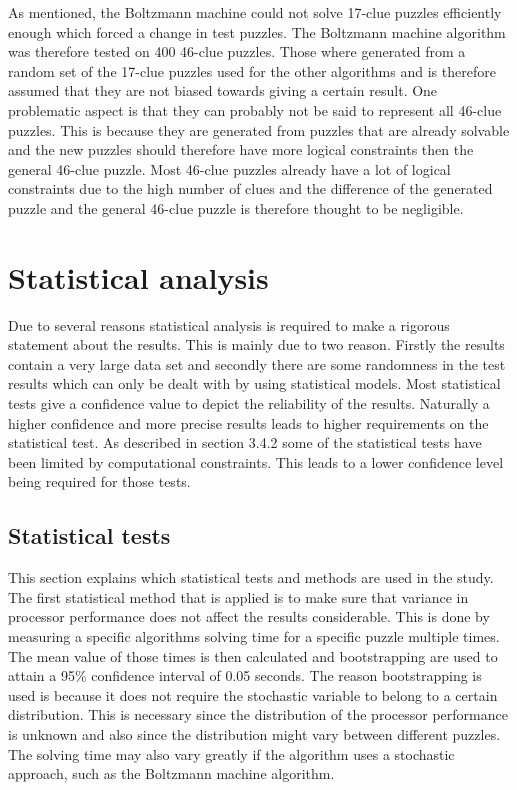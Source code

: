 \documentclass[a4paper,11pt]{kth-mag}
\begin{document}
As mentioned, the Boltzmann machine could not solve 17-clue puzzles efficiently enough which forced a change in test puzzles. The Boltzmann machine algorithm was therefore tested on 400 46-clue puzzles. Those where generated from a random set of the 17-clue puzzles used for the other algorithms and is therefore assumed that they are not biased towards giving a certain result.
One problematic aspect is that they can probably not be said to represent all 46-clue puzzles.
This is because they are generated from puzzles that are already solvable and the new puzzles should therefore have more logical constraints then the general 46-clue puzzle.
Most 46-clue puzzles already have a lot of logical constraints due to the high number of clues and the difference of the generated puzzle and the general 46-clue puzzle is therefore thought to be negligible.
\FloatBarrier
\section{Statistical analysis}
\label{sec:statisticalAnalysis}
Due to several reasons statistical analysis is required to make a rigorous statement about the results. 
This is mainly due to two reason.
Firstly the results contain a very large data set and secondly there are some randomness in the test results which can only be dealt with by using statistical models. 
Most statistical tests give a confidence value to depict the reliability of the results. 
Naturally a higher confidence and more precise results leads to higher requirements on the statistical test.
As described in section 3.4.2 some of the statistical tests have been limited by computational constraints.
This leads to a lower confidence level being required for those tests.

\FloatBarrier
\subsection{Statistical tests}
\label{sec:statisticalTests}
This section explains which statistical tests and methods are used in the study.
The first statistical method that is applied is to make sure that variance in processor performance does not affect the results considerable. 
This is done by measuring a specific algorithms solving time for a specific puzzle multiple times. 
The mean value of those times is then calculated and bootstrapping are used to attain a 95\% confidence interval of 0.05 seconds. 
The reason bootstrapping is used is because it does not require the stochastic variable to belong to a certain distribution. 
This is necessary since the distribution of the processor performance is unknown and also since the distribution might vary between different puzzles. The solving time may also vary greatly if the algorithm uses a stochastic approach, such as the Boltzmann machine algorithm.
\end{document}
